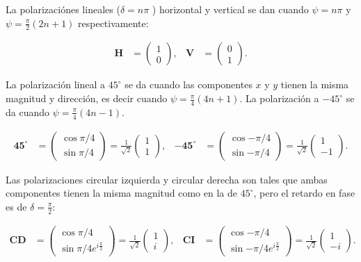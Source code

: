 La polarizaciónes lineales ($\delta = n\pi$ ) horizontal y vertical se dan cuando $\psi
= n\pi$ y $\psi = \frac{\pi}{2}(2n+1)$ respectivamente:

\begin{align*}
\mathbf{H} &=\begin{pmatrix}1\\0\end{pmatrix},& \mathbf{V} &=\begin{pmatrix}0\\1\end{pmatrix}.
\end{align*}

La polarización lineal a $45^{\circ}$ se da cuando las componentes $x$
y $y$ tienen la misma magnitud y dirección, es decir cuando
$\psi=\frac{\pi}{4}(4n+1)$. La polarización a  $-45^{\circ}$ se da cuando
$\psi=\frac{\pi}{4}(4n-1)$.

\begin{align*}
\mathbf{45^{\circ}}
&=\begin{pmatrix}\cos{\pi/4}\\\sin{\pi/4}\end{pmatrix}=\frac{1}{\sqrt{2}}
\begin{pmatrix}1\\1\end{pmatrix},&
\mathbf{-45^{\circ}} 
&=\begin{pmatrix}\cos{-\pi/4}\\\sin{-\pi/4}\end{pmatrix}=\frac{1}{\sqrt{2}}\begin{pmatrix}1\\-1\end{pmatrix}. 
\end{align*} 

Las polarizaciones circular izquierda y circular derecha son tales que
ambas componentes tienen la misma magnitud como en la de $45^{\circ}$,
pero el retardo en fase es de $\delta = \frac{\pi}{2}$:

\begin{align*}
\mathbf{CD}
&=\begin{pmatrix}\cos{\pi/4}\\\sin{\pi/4}e^{i\frac{\pi}{2}}\end{pmatrix}=\frac{1}{\sqrt{2}}
\begin{pmatrix}1\\i\end{pmatrix},&
\mathbf{CI} 
&=\begin{pmatrix}\cos{-\pi/4}\\\sin{-\pi/4}e^{i\frac{\pi}{2}}\end{pmatrix}=\frac{1}{\sqrt{2}}\begin{pmatrix}1\\-i\end{pmatrix}. 
\end{align*} 

